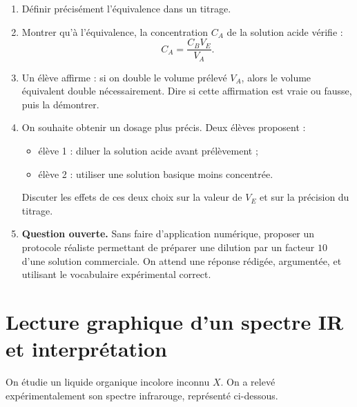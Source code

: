 \documentclass[11pt,a4paper]{article}
\begin{document}
\begin{enumerate}[label=\textbf{\arabic*.}]
    \item Définir précisément l’équivalence dans un titrage.

    \item Montrer qu’à l’équivalence, la concentration \(C_A\) de la solution acide vérifie :
    \[
    C_A=\frac{C_BV_E}{V_A}.
    \]
    \item Un élève affirme : \og si on double le volume prélevé \(V_A\), alors le volume équivalent double nécessairement\fg.  
    Dire si cette affirmation est vraie ou fausse, puis la démontrer.
    \item On souhaite obtenir un dosage plus précis. Deux élèves proposent :
    \begin{itemize}
        \item élève 1 : diluer la solution acide avant prélèvement ;
        \item élève 2 : utiliser une solution basique moins concentrée.
    \end{itemize}
    Discuter les effets de ces deux choix sur la valeur de \(V_E\) et sur la précision du titrage.
    \item \textbf{Question ouverte.}  
    Sans faire d’application numérique, proposer un protocole réaliste permettant de préparer une dilution par un facteur \(10\) d’une solution commerciale.  
    On attend une réponse rédigée, argumentée, et utilisant le vocabulaire expérimental correct.
\end{enumerate}

\section{Lecture graphique d’un spectre IR et interprétation}

On étudie un liquide organique incolore inconnu \(X\).  
On a relevé expérimentalement son spectre infrarouge, représenté ci-dessous.
\end{document}
